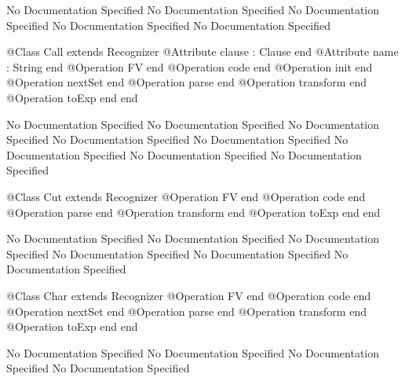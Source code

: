 No Documentation Specified
No Documentation Specified
No Documentation Specified
No Documentation Specified
No Documentation Specified
\begin{Interface}
@Class Call extends Recognizer
  @Attribute clause : Clause end
  @Attribute name : String end
  @Operation FV end
  @Operation code end
  @Operation init end
  @Operation nextSet end
  @Operation parse end
  @Operation transform end
  @Operation toExp end
end
\end{Interface}
No Documentation Specified
No Documentation Specified
No Documentation Specified
No Documentation Specified
No Documentation Specified
No Documentation Specified
No Documentation Specified
No Documentation Specified
\begin{Interface}
@Class Cut extends Recognizer
  @Operation FV end
  @Operation code end
  @Operation parse end
  @Operation transform end
  @Operation toExp end
end
\end{Interface}
No Documentation Specified
No Documentation Specified
No Documentation Specified
No Documentation Specified
No Documentation Specified
No Documentation Specified
\begin{Interface}
@Class Char extends Recognizer
  @Operation FV end
  @Operation code end
  @Operation nextSet end
  @Operation parse end
  @Operation transform end
  @Operation toExp end
end
\end{Interface}
No Documentation Specified
No Documentation Specified
No Documentation Specified
No Documentation Specified
